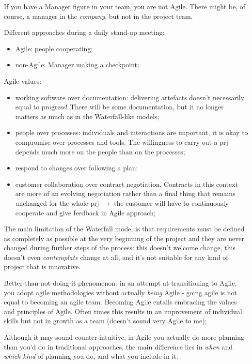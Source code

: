 If you have a Manager figure in your team, you are not Agile. There might be, of course, a manager in the \textit{company}, but not in the project team.

\noindent Different approaches during a daily stand-up meeting:
\begin{itemize}
    \item Agile: people cooperating;
    \item non-Agile: Manager making a checkpoint;
\end{itemize}

Agile values:
\begin{itemize}
    \item working software over documentation: delivering artefacts doesn't necessarily equal to progress! There will be some documentation, but it no longer matters as much as in the Waterfall-like models;
    \item people over processes: individuals and interactions are important, it is okay to compromise over processes and tools. The willingness to carry out a prj depends much more on the people than on the processes;
    \item respond to changes over following a plan:
    \item customer collaboration over contract negotiation. Contracts in this context are more of an evolving negotiation rather than a final thing that remains unchanged for the whole prj $\rightarrow$ the customer will have to continuously cooperate and give feedback in Agile approach;
\end{itemize}

The main limitation of the Waterfall model is that requirements must be defined as completely as possible at the very beginning of the project and they are never changed during further steps of the process: this doesn't welcome change, this doesn't even \textit{contemplate} change at all, and it's not suitable for any kind of project that is innovative.

\noindent Better-than-not-doing-it phenomenon: in an attempt at transitioning to Agile, you adopt agile methodologies without actually \textit{being} Agile - going agile is not equal to becoming an agile team. Becoming Agile entails embracing the values and principles of Agile. Often times this results in an improvement of individual skills but not in growth as a team (doesn't sound very Agile to me);

\noindent Although it may sound counter-intuitive, in Agile you actually do more planning than you'd do in traditional approaches, the main difference lies in \textit{when} and \textit{which kind} of planning you do, and what you include in it.


